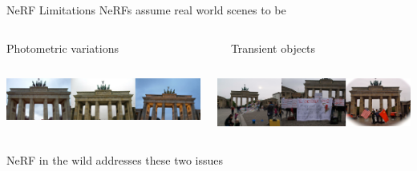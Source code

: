 \documentclass[aspectratio=1610]{beamer}
\renewcommand{\bold}[1]{\textbf{\structure{#1}}}
\begin{document}
\begin{frame}{NeRF Limitations}
    NeRFs assume real world scenes to be \bold{static}
    \vspace{1.5cm}
    \begin{columns}[t]
        \begin{column}{.4\textwidth}
            Photometric variations\\
        \end{column}
        \begin{column}{.4\textwidth}
            Transient objects\\
        \end{column}
    \end{columns}
    \begin{columns}
        \begin{column}{.4\textwidth}
            \begin{center}
                \includegraphics[width=\textwidth]{issues-var.png}
            \end{center}
        \end{column}
        \begin{column}{.4\textwidth}
            \begin{center}
                \includegraphics[width=\textwidth]{issues-transient.png}
            \end{center}
        \end{column}
    \end{columns}
    \vspace{1.5cm}
    \pause
    NeRF in the wild addresses these two issues
\end{frame}
\end{document}
